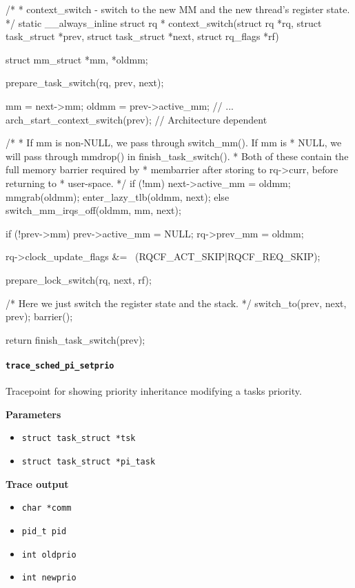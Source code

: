 \begin{code}
/*
 * context_switch - switch to the new MM and the new thread's register state.
 */
static __always_inline struct rq *
context_switch(struct rq *rq, struct task_struct *prev,
	       struct task_struct *next, struct rq_flags *rf) {
	struct mm_struct *mm, *oldmm;

	prepare_task_switch(rq, prev, next);

	mm = next->mm;
	oldmm = prev->active_mm;
        // ...
	arch_start_context_switch(prev); // Architecture dependent

	/*
	 * If mm is non-NULL, we pass through switch_mm(). If mm is
	 * NULL, we will pass through mmdrop() in finish_task_switch().
	 * Both of these contain the full memory barrier required by
	 * membarrier after storing to rq->curr, before returning to
	 * user-space.
	 */
	if (!mm) {
		next->active_mm = oldmm;
		mmgrab(oldmm);
		enter_lazy_tlb(oldmm, next);
	} else
		switch_mm_irqs_off(oldmm, mm, next);

	if (!prev->mm) {
		prev->active_mm = NULL;
		rq->prev_mm = oldmm;
	}

	rq->clock_update_flags &= ~(RQCF_ACT_SKIP|RQCF_REQ_SKIP);

	prepare_lock_switch(rq, next, rf);

	/* Here we just switch the register state and the stack. */
	switch_to(prev, next, prev);
	barrier();

	return finish_task_switch(prev);
}
\end{code}

\paragraph{\texttt{trace\_sched\_pi\_setprio}}
Tracepoint for showing priority inheritance modifying a tasks priority.

\textbf{Parameters}
\begin{itemize}
    \item \verb|struct task_struct *tsk|
    \item \verb|struct task_struct *pi_task|
\end{itemize}

\textbf{Trace output}
\begin{itemize}
    \item \verb|char *comm|
    \item \verb|pid_t pid|
    \item \verb|int oldprio|
    \item \verb|int newprio|
\end{itemize}


